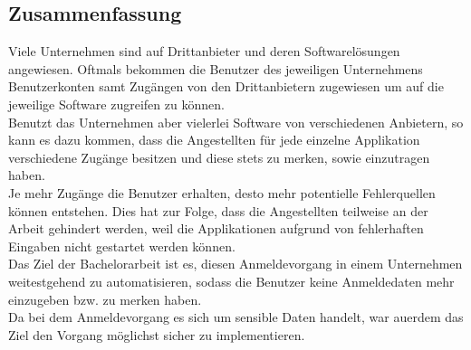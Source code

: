 \subsection*{Zusammenfassung}
\pagestyle{empty}
Viele Unternehmen sind auf Drittanbieter und deren Softwarelösungen angewiesen. Oftmals bekommen die Benutzer des jeweiligen Unternehmens Benutzerkonten samt Zugängen von den Drittanbietern zugewiesen um auf die jeweilige Software zugreifen zu können. \\
Benutzt das Unternehmen aber vielerlei Software von verschiedenen Anbietern, so kann es dazu kommen, dass die Angestellten für jede einzelne Applikation verschiedene Zugänge besitzen und diese stets zu merken, sowie einzutragen haben. \\ 
Je mehr Zugänge die Benutzer erhalten, desto mehr potentielle Fehlerquellen können entstehen. Dies hat zur Folge, dass die Angestellten teilweise an der Arbeit gehindert werden, weil die Applikationen aufgrund von fehlerhaften Eingaben nicht gestartet werden können. \\
Das Ziel der Bachelorarbeit ist es, diesen Anmeldevorgang in einem Unternehmen weitestgehend zu automatisieren, sodass die Benutzer keine Anmeldedaten mehr einzugeben bzw. zu merken haben. \\
Da bei dem Anmeldevorgang es sich um sensible Daten handelt, war au\ß erdem das Ziel den Vorgang möglichst sicher zu implementieren.